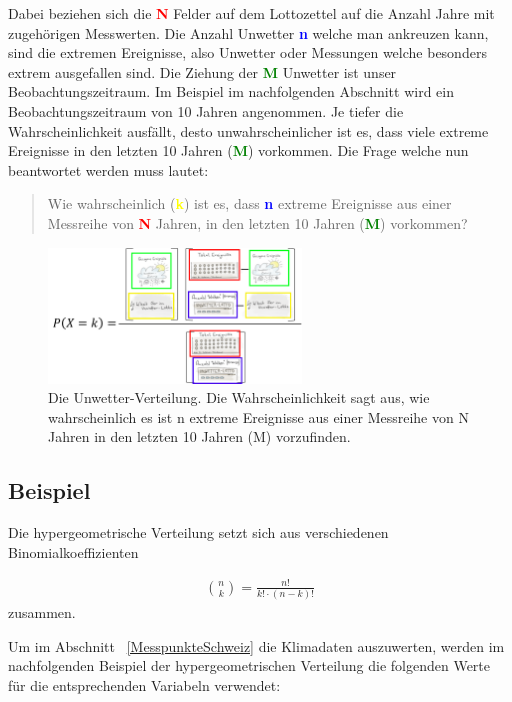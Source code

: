 \begin{refsection}
Dabei beziehen sich die \textcolor{red}{\textbf{N}} Felder auf dem Lottozettel auf die Anzahl Jahre mit zugehörigen Messwerten. Die Anzahl Unwetter \textcolor{blue}{\textbf{n}} welche man ankreuzen kann, sind die extremen Ereignisse, also Unwetter oder Messungen welche besonders extrem ausgefallen sind. Die Ziehung der \textcolor{green}{\textbf{M}} Unwetter ist unser Beobachtungszeitraum. Im Beispiel im nachfolgenden Abschnitt wird ein Beobachtungszeitraum von 10 Jahren angenommen. Je tiefer die Wahrscheinlichkeit ausfällt, desto unwahrscheinlicher ist es, dass viele extreme Ereignisse in den letzten 10 Jahren (\textcolor{green}{\textbf{M}}) vorkommen. Die Frage welche nun beantwortet werden muss lautet:

\begin{quote}
Wie wahrscheinlich (\textcolor{yellow}{\textbf{k}}) ist es, dass \textcolor{blue}{\textbf{n}} extreme Ereignisse aus einer Messreihe von \textcolor{red}{\textbf{N}} Jahren, in den letzten 10 Jahren (\textcolor{green}{\textbf{M}}) vorkommen? 
\end{quote}

\begin{figure}
\centering
\includegraphics[width=0.6\textwidth]{extrem/Unwettervert.pdf}
\caption{Die Unwetter-Verteilung. Die Wahrscheinlichkeit sagt aus, wie wahrscheinlich es ist n extreme Ereignisse aus einer Messreihe von N Jahren in den letzten 10 Jahren (M) vorzufinden.}
\label{UnwetterVerteilung}
\end{figure}


\subsection{Beispiel} \label{Beispiel}
Die hypergeometrische Verteilung setzt sich aus verschiedenen Binomialkoeffizienten

\begin{align*}
\binom{n}{k} = \frac {n!}{k! \cdot (n-k)!} 
\end{align*}
zusammen.

Um im Abschnitt ~\ref{MesspunkteSchweiz}  die Klimadaten auszuwerten, werden im nachfolgenden Beispiel der hypergeometrischen Verteilung die folgenden Werte für die entsprechenden Variabeln verwendet:


\end{refsection}
